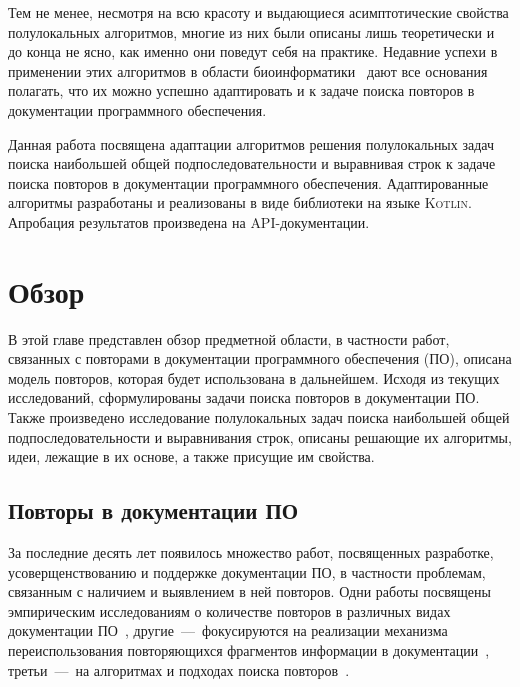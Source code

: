 Тем не менее, несмотря на всю красоту и выдающиеся асимптотические свойства полулокальных алгоритмов, многие из них были описаны лишь теоретически и до конца не ясно, как именно они поведут себя на практике.
Недавние успехи в применении этих алгоритмов в области биоинформатики~\cite{baxter2012conserved,davies2015analysis, picot2010evolutionary} дают все основания полагать, что их можно успешно адаптировать и к задаче поиска повторов в документации программного обеспечения.

Данная работа посвящена адаптации алгоритмов решения полулокальных задач поиска наибольшей общей подпоследовательности и выравнивая строк к задаче поиска повторов в документации программного обеспечения.
Адаптированные алгоритмы разработаны и реализованы в виде библиотеки на языке \textsc{Kotlin}.
Апробация результатов произведена на {API}-документации.


\section{Обзор}
\label{sec:overview}
В этой главе представлен обзор предметной области, в частности работ, связанных с повторами в документации программного обеспечения (ПО), описана модель повторов, которая будет использована в дальнейшем. 
Исходя из текущих исследований, сформулированы задачи поиска повторов в документации ПО.
Также произведено исследование полулокальных задач поиска наибольшей общей подпоследовательности и выравнивания строк, описаны решающие их алгоритмы, %
идеи, лежащие в их основе, а также присущие им свойства.

\subsection{Повторы в документации ПО}\label{duplicateReport}

За последние десять лет появилось множество работ, посвященных разработке, усоверщенствованию и поддержке документации ПО, в частности проблемам, связанным с наличием и выявлением в ней повторов.
Одни работы посвящены эмпирическим исследованиям о количестве повторов  в различных видах документации ПО~\cite{poruban2016preliminary,juergens2010can,oumaziz2017documentation}, другие~---~фокусируются на реализации механизма переиспользования повторяющихся фрагментов информации в документации~\cite{koznov2015clone,horie2010tool,poruban2014reusable}, третьи~---~на алгоритмах и подходах поиска повторов~\cite{luciv2018detecting,luciv2019interactive,blasi2018replicomment,rago2016identifying, soto2015similarity}.

